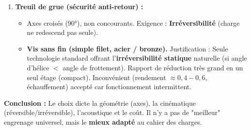 \documentclass[11pt]{article}
\begin{document}
\begin{exoresolu}
\begin{enumerate}
\begin{itemize}
              \end{itemize}
        \item \textbf{Treuil de grue (sécurité anti-retour) :}
              \begin{itemize}
                  \item Axes croisés (90°), non concourants. Exigence : \textbf{Irréversibilité} (charge ne redescend pas seule).
                  \item \textbf{Vis sans fin (simple filet, acier / bronze).} Justification : Seule technologie standard offrant l'\textbf{irréversibilité statique} naturelle (si angle d'hélice $<$ angle de frottement). Rapport de réduction très grand en un seul étage (compact). Inconvénient (rendement $\approx 0,4-0,6$, échauffement) accepté car fonctionnement intermittent.
              \end{itemize}
    \end{enumerate}
    \textbf{Conclusion :} Le choix dicte la géométrie (axes), la cinématique (réversible/irréversible), l'acoustique et le coût. Il n'y a pas de "meilleur" engrenage universel, mais le \textbf{mieux adapté} au cahier des charges.
\end{exoresolu}
\end{document}
